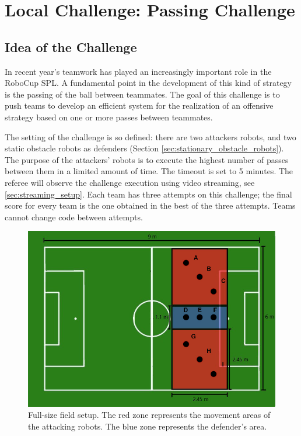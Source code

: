 \section{Local Challenge: Passing Challenge}
\label{sec:PassingChallenge}

\subsection{Idea of the Challenge}
In recent year's teamwork has played an increasingly important role in the RoboCup SPL. A fundamental point in the development of this kind of strategy is the passing of the ball between teammates. The goal of this challenge is to push teams to develop an efficient system for the realization of an offensive strategy based on one or more passes between teammates. 

The setting of the challenge is so defined: there are two attackers robots, and two static obstacle robots as defenders (\cf Section \ref{sec:stationary_obstacle_robots}). The purpose of the attackers' robots is to execute the highest number of passes between them in a limited amount of time. The timeout is set to 5 minutes.
The referee will observe the challenge execution using video streaming, see \ref{sec:streaming_setup}.
Each team has three attempts on this challenge; the final score for every team is the one obtained in the best of the three attempts. Teams cannot change code between attempts.
\begin{figure}[ht]
\includegraphics[width=0.95\linewidth]{figs/ch_2_full.jpg}
\caption{Full-size field setup. The red zone represents the movement areas of the attacking robots. The blue zone represents the defender's area. }
\label{ch2:zone96}
\centering
\end{figure}

